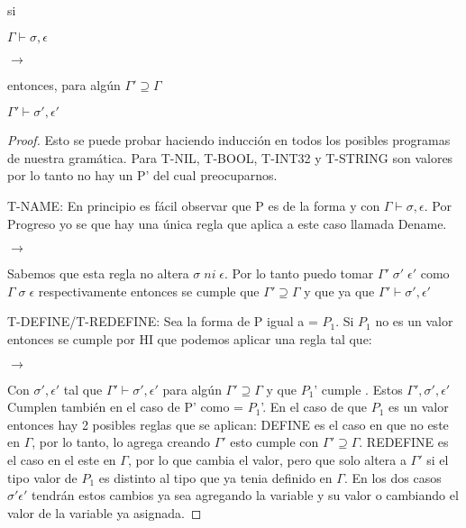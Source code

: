 \begin{theorem}[Preservacion]
    si


    $\Gamma \vdash \sigma, \epsilon$

      $\rightarrow$  

    entonces, para algún $\Gamma' \supseteq  \Gamma$


    $\Gamma' \vdash \sigma', \epsilon'$

\end{theorem}

\begin{proof}
Esto se puede probar haciendo inducción en todos los posibles programas de nuestra
gramática. Para T-NIL, T-BOOL, T-INT32 y T-STRING son valores por lo tanto no hay un P' del cual preocuparnos.

T-NAME: En principio es fácil observar que P es de la forma  y  con $\Gamma \vdash \sigma, \epsilon$.
Por Progreso yo se que hay una única regla que aplica a este caso llamada Dename.

  $\rightarrow$  

Sabemos que esta regla no altera $\sigma \; ni \; \epsilon$.
Por lo tanto puedo tomar $\Gamma' \; \sigma' \; \epsilon'$ como $\Gamma \; \sigma \; \epsilon$ respectivamente entonces se cumple que $\Gamma' \supseteq  \Gamma$
y que  ya que $\Gamma' \vdash \sigma', \epsilon'$

T-DEFINE/T-REDEFINE: Sea la forma de P igual a   = $P_{1}$. Si $P_{1}$ no es un valor entonces se cumple por HI que podemos aplicar una regla tal que:

  $\rightarrow$ 

Con $\sigma', \epsilon'$ tal que $\Gamma' \vdash \sigma', \epsilon'$ para algún $\Gamma' \supseteq  \Gamma$ y que $P_{1}$' cumple .
Estos $\Gamma', \sigma', \epsilon'$ Cumplen también en el caso de P' como  = $P_{1}$'.
En el caso de  que $P_{1}$ es un valor entonces hay 2 posibles reglas que se aplican:
DEFINE es el caso en que  no este en $\Gamma$, por lo tanto, lo agrega creando $\Gamma'$ esto cumple con  $\Gamma' \supseteq  \Gamma$.
REDEFINE es el caso en el  este en $\Gamma$, por lo que cambia el valor, pero que solo altera a $\Gamma'$ si el tipo valor de $P_{1}$ es distinto
al tipo que ya tenia definido en $\Gamma$. En los dos casos $\sigma' \epsilon'$ tendrán estos cambios ya sea agregando la variable y su valor o cambiando el valor
de la variable ya asignada.


\end{proof}
